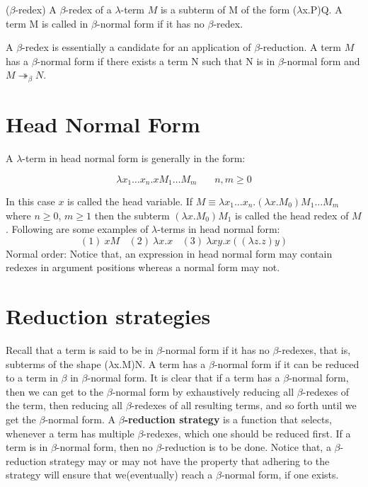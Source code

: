 \begin{def1}
($\beta$-redex) A $\beta$-redex of a $\lambda$-term $M$ is a subterm of M of the form ($\lambda$x.P)Q. A term M is called in $\beta$-normal form if it has no $\beta$-redex.
\end{def1}
A $\beta$-redex is essentially a candidate for an application of $\beta$-reduction. A term $M$ has a $\beta$-normal form if there exists a term N such that N is in $\beta$-normal form and $M \twoheadrightarrow _\beta N$. 

\section{Head Normal Form}

\noindent A $\lambda$-term in head normal form is generally in the form:

\begin{equation*}
\lambda x_1\ldots x_n.xM_1\ldots M_m\ \ \ \ \ \ \ \ n,m\geqslant 0
\end{equation*}

In this case $x$ is called the head variable. If $M \equiv \lambda x_1\ldots x_n.(\lambda x.M_0)M_1\ldots M_m$ where $n\geqslant 0$, $m\geqslant 1$ then the subterm $(\lambda x.M_0)M_1$ is called the head redex of $M$. Following are some examples of $\lambda$-terms in head normal form:
\begin{equation*}
(1)\ xM\ \ \ \ (2)\ \lambda x.x\ \ \ \ (3)\ \lambda xy.x((\lambda z.z)y)
\end{equation*}Normal order:
Notice that, an expression in head normal form may contain redexes in argument positions whereas a normal form may not.


\section{Reduction strategies}\label{sec:reductionstrategy}
\noindent Recall that a term is said to be in $\beta$-normal form if it has no $\beta$-redexes, that is, subterms of the shape ($\lambda$x.M)N. A term has a $\beta$-normal form if it can be reduced to a term in $\beta$ in $\beta$-normal form. It is clear that if a term has a $\beta$-normal form, then we can get to the $\beta$-normal form by exhaustively reducing all $\beta$-redexes of the term, then reducing all $\beta$-redexes of all resulting terms, and so forth until we get the $\beta$-normal form. A \textbf{$\beta$-reduction strategy} is a function that selects, whenever a term has multiple $\beta$-redexes, which one should be reduced first. If a term is in $\beta$-normal form, then no $\beta$-reduction is to be done. Notice that, a $\beta$-reduction strategy may or may not have the property that adhering to the strategy will ensure that we(eventually) reach a $\beta$-normal form, if one exists. 

